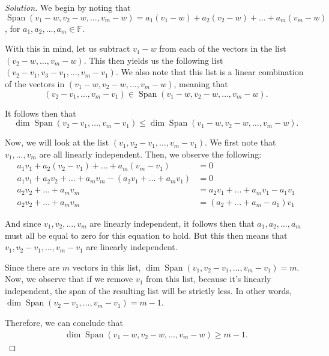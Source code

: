 \documentclass{article}
\newenvironment{solution}{\begin{proof}[Solution]}{\end{proof}}
\DeclareMathOperator*{\Span}{Span}
\begin{document}
	\begin{solution}
		We begin by noting that $\Span(v_{1} - w, v_{2} - w, \ldots, v_{m} - w) = a_{1}(v_{1} - w) + a_{2}(v_{2} - w) + \ldots + a_{m}(v_{m} - w)$, for $a_{1}, a_{2}, \ldots, a_{m} \in \mathbb{F}$. 
		
		With this in mind, let us subtract $v_{1} - w$ from each of the vectors in the list $(v_{2} - w, \ldots, v_{m} - w)$. This then yields us the following list $(v_{2} - v_{1}, v_{3} - v_{1}, \ldots, v_{m} - v_{1})$. We also note that this list is a linear combination of the vectors in $(v_{1} - w, v_{2} - w, \ldots, v_{m} - w)$, meaning that
		\begin{equation*}
			(v_{2} - v_{1}, \ldots, v_{m} - v_{1}) \in \Span(v_{1} - w, v_{2} - w, \ldots, v_{m} - w).
		\end{equation*}
	
		It follows then that
		\begin{equation*}
			\dim \Span(v_{2} - v_{1}, \ldots, v_{m} - v_{1}) \leq \dim \Span (v_{1} - w, v_{2} - w, \ldots, v_{m} - w).
		\end{equation*}
	
		Now, we will look at the list $(v_{1}, v_{2} - v_{1}, \ldots, v_{m} - v_{1})$. We first note that $v_{1}, \ldots, v_{m}$ are all linearly independent. Then, we observe the following:
		\begin{align*}
			a_{1}v_{1} + a_{2}(v_{2} - v_{1}) + \ldots + a_{m}(v_{m} - v_{1}) &= 0 \\
			a_{1}v_{1} + a_{2}v_{2} + \ldots + a_{m}v_{m} - (a_{2}v_{1} + \ldots + a_{m}v_{1}) &= 0 \\
			a_{2}v_{2} + \ldots + a_{m}v_{m} &= a_{2}v_{1} + \ldots + a_{m}v_{1} - a_{1}v_{1}\\
			a_{2}v_{2} + \ldots + a_{m}v_{m} &= (a_{2} + \ldots + a_{m} - a_{1})v_{1}
		\end{align*}	
	
		And since $v_{1}, v_{2}, \ldots, v_{m}$ are linearly independent, it follows then that $a_{1}, a_{2}, \ldots, a_{m}$ must all be equal to zero for this equation to hold. But this then means that $v_{1}, v_{2} - v_{1}, \ldots, v_{m} - v_{1}$ are linearly independent.
		
		Since there are $m$ vectors in this list, $\dim \Span(v_{1}, v_{2} - v_{1}, \ldots, v_{m} - v_{1}) = m$. Now, we observe that if we remove $v_{1}$ from this list, because it's linearly independent, the span of the resulting list will be strictly less. In other words, $\dim \Span(v_{2} - v_{1}, \ldots, v_{m} - v_{1}) = m-1$.
		
		Therefore, we can conclude that
		\begin{align*}
			\dim \Span (v_{1} - w, v_{2} - w, \ldots, v_{m} - w) \geq m -1.
		\end{align*}
	\end{solution}
	
\end{document}
